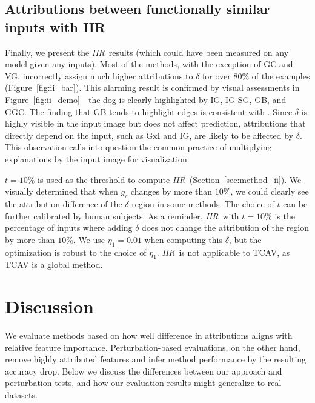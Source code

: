 \documentclass[twoside]{article}
\newcommand{\IIR}{\textit{IIR}}
\begin{document}
\subsection{Attributions between functionally similar inputs with IIR}
Finally, we present the \IIR~results (which could have been measured on any model given any inputs). Most of the methods, with the exception of GC and VG, incorrectly assign much higher attributions to $\delta$ for over 80\% of the examples (Figure~\ref{fig:ii_bar}). This alarming result is confirmed by visual assessments in Figure~\ref{fig:ii_demo}---the dog is clearly highlighted by IG, IG-SG, GB, and GGC. The finding that GB tends to highlight edges is consistent with \citet{Adebayo18,Nie18}. Since $\delta$ is highly visible in the input image but does not affect prediction, attributions that directly depend on the input, such as GxI and IG, are likely to be affected by $\delta$. This observation calls into question the common practice of multiplying explanations by the input image for visualization.

$t=10\%$ is used as the threshold to compute \IIR~(Section~\ref{sec:method_ii}). We visually determined that when $g_c$ changes by more than $10\%$, we could clearly see the attribution difference of the $\delta$ region in some methods. The choice of $t$ can be further calibrated by human subjects. As a reminder, \IIR~with $t=10\%$ is the percentage of inputs where adding $\delta$ does not change the attribution of the region by more than $10\%$. We use $\eta_1 = 0.01$ when computing this $\delta$, but the optimization is robust to the choice of $\eta_1$. \IIR~is not applicable to TCAV, as TCAV is a global method.

\section{Discussion}
We evaluate methods based on how well difference in attributions aligns with relative feature importance. Perturbation-based evaluations, on the other hand, remove highly attributed features and infer method performance by the resulting accuracy drop. Below we discuss the differences between our approach and perturbation tests, and how our evaluation results might generalize to real datasets.

\end{document}
